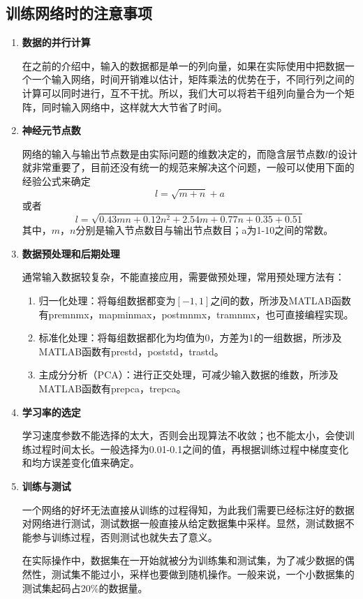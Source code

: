 \documentclass[bwprint]{cumcmthesis}
\begin{document}
\subsection{训练网络时的注意事项}
\begin{enumerate}
	\item \textbf{数据的并行计算}
	
	在之前的介绍中，输入的数据都是单一的列向量，如果在实际使用中把数据一个一个输入网络，时间开销难以估计，矩阵乘法的优势在于，不同行列之间的计算可以同时进行，互不干扰。所以，我们大可以将若干组列向量合为一个矩阵，同时输入网络中，这样就大大节省了时间。
	
	\item \textbf{神经元节点数}
	
	网络的输入与输出节点数是由实际问题的维数决定的，而隐含层节点数$l$的设计就非常重要了，目前还没有统一的规范来解决这个问题，一般可以使用下面的经验公式来确定
	\[l  = \sqrt {m + n}  + a\]
	或者
	\[l = \sqrt {0.43mn + 0.12{n^2} + 2.54m + 0.77n + 0.35 + 0.51} \]
	其中，$m$，$n$分别是输入节点数目与输出节点数目；a为1-10之间的常数\cite{MATLAB}。
	
	\item \textbf{数据预处理和后期处理}
	
	通常输入数据较复杂，不能直接应用，需要做预处理，常用预处理方法有：
	\begin{enumerate}
		\item 归一化处理：将每组数据都变为$[-1,1]$之间的数，所涉及MATLAB函数有premnmx，mapminmax，postmnmx，tramnmx，也可直接编程实现。
		\item 标准化处理：将每组数据都化为均值为0，方差为1的一组数据，所涉及MATLAB函数有prestd，poststd，trastd。
		\item 主成分分析（PCA）：进行正交处理，可减少输入数据的维数，所涉及MATLAB函数有prepca，trepca\cite{MATLAB}。
	\end{enumerate}

	\item \textbf{学习率的选定}
	
	学习速度参数不能选择的太大，否则会出现算法不收敛；也不能太小，会使训练过程时间太长。一般选择为0.01-0.1之间的值，再根据训练过程中梯度变化和均方误差变化值来确定\cite{MATLAB}。
	
	\item \textbf{训练与测试}
	
	一个网络的好坏无法直接从训练的过程得知，为此我们需要已经标注好的数据对网络进行测试，测试数据一般直接从给定数据集中采样。显然，测试数据不能参与训练过程，否则测试也就失去了意义。
	
	在实际操作中，数据集在一开始就被分为训练集和测试集，为了减少数据的偶然性，测试集不能过小，采样也要做到随机操作。一般来说，一个小数据集的测试集起码占20\%的数据量。
	
\end{enumerate}
\end{document}
